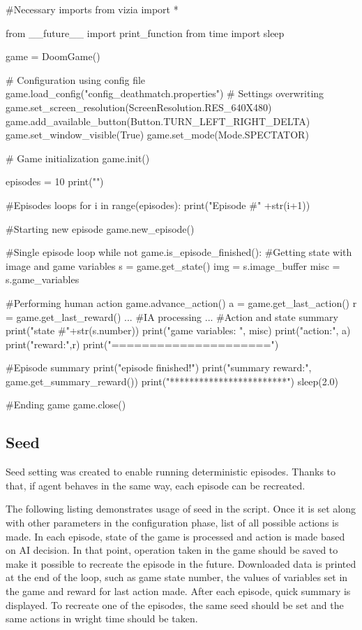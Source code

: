 \begin{pblock}
#Necessary imports
from vizia import *

from __future__ import print_function
from time import sleep

game = DoomGame()

# Configuration using config file
game.load_config("config_deathmatch.properties")
# Settings overwriting 
game.set_screen_resolution(ScreenResolution.RES_640X480)
game.add_available_button(Button.TURN_LEFT_RIGHT_DELTA)
game.set_window_visible(True)
game.set_mode(Mode.SPECTATOR)

# Game initialization 
game.init()

episodes = 10
print("")

#Episodes loops
for i in range(episodes):
	print("Episode #" +str(i+1))
	
	#Starting new episode
	game.new_episode()

	#Single episode loop
	while not game.is_episode_finished():
		#Getting state with image and game variables
		s = game.get_state()
		img = s.image_buffer
		misc = s.game_variables

		#Performing human action
		game.advance_action()
		a = game.get_last_action()
		r = game.get_last_reward()
		...		
		#IA processing
		...
		#Action and state summary
		print("state #"+str(s.number))
		print("game variables: ", misc)
		print("action:", a)
		print("reward:",r)
		print("=====================")

	#Episode summary
	print("episode finished!")
	print("summary reward:", game.get_summary_reward())
	print("************************")
	sleep(2.0)

#Ending game
game.close()
\end{pblock}

\subsection {Seed}
	Seed setting was created to enable running deterministic episodes. Thanks to that, if agent behaves in the same way, each episode can be recreated.

The following listing demonstrates usage of seed in the script. Once it is set along with other parameters in the configuration phase, list of all possible actions is made. In each episode, state of the game is processed and action is made based on AI decision. In that point, operation taken in the game should be saved to make it possible to recreate the episode in the future. Downloaded data is printed at the end of the loop, such as game state number, the values of variables set in the game and reward for last action made. After each episode, quick summary is displayed. To recreate one of the episodes, the same seed should be set and the same actions in wright time should be taken.

